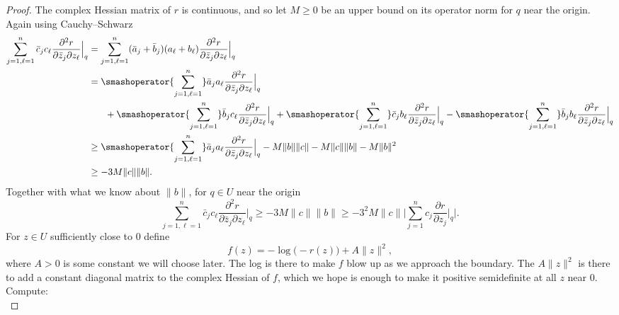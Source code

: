 \documentclass[12pt,openany]{book}
\newcommand{\snorm}[1]{\lVert {#1} \rVert}
\newcommand{\Babs}[1]{\Bigl\lvert {#1} \Bigr\rvert}
\newcommand{\BBabs}[1]{\Biggl\lvert {#1} \Biggr\rvert}
\theoremstyle{plain}
\theoremstyle{remark}
\theoremstyle{definition}
\theoremstyle{exercise}
\theoremstyle{example}
\begin{document}
\begin{proof}
\pagebreak[1]
The complex Hessian matrix of $r$ is continuous, and so let
$M \geq 0$ be an upper bound on its operator norm for $q$ near the origin.
Again using Cauchy--Schwarz
\begin{equation*}
\begin{split}
\sum_{j=1,\ell=1}^n
\bar{c}_j c_\ell \frac{\partial^2 r}{\partial \bar{z}_j \partial z_\ell} \Big|_q 
& =
\sum_{j=1,\ell=1}^n
( \bar{a}_j + \bar{b}_j )  (a_\ell + b_\ell) \frac{\partial^2 r}{\partial \bar{z}_j \partial z_\ell} \Big|_q 
\\
& =
\smashoperator{\sum_{j=1,\ell=1}^n}
\bar{a}_j a_\ell \frac{\partial^2 r}{\partial \bar{z}_j \partial z_\ell} \Big|_q 
\\
& \phantom{=} \quad
+
\smashoperator{\sum_{j=1,\ell=1}^n}
\bar{b}_j c_\ell \frac{\partial^2 r}{\partial \bar{z}_j \partial z_\ell} \Big|_q 
+
\smashoperator{\sum_{j=1,\ell=1}^n}
\bar{c}_j  b_\ell \frac{\partial^2 r}{\partial \bar{z}_j \partial z_\ell} \Big|_q 
-
\smashoperator{\sum_{j=1,\ell=1}^n}
\bar{b}_j  b_\ell \frac{\partial^2 r}{\partial \bar{z}_j \partial z_\ell} \Big|_q 
\\
& \geq
\smashoperator{\sum_{j=1,\ell=1}^n}
\bar{a}_j a_\ell \frac{\partial^2 r}{\partial \bar{z}_j \partial z_\ell} \Big|_q 
-
M\snorm{b}\snorm{c}
-
M\snorm{c}\snorm{b}
-
M\snorm{b}^2
\\
& \geq
-
3 M\snorm{c}\snorm{b} .
\end{split}
\end{equation*}
Together with what we know about
$\snorm{b}$, for $q \in U$ near the origin
\begin{equation*}
\sum_{j=1,\ell=1}^n
\bar{c}_j c_\ell \frac{\partial^2 r}{\partial \bar{z}_j \partial z_\ell} \Big|_q 
\geq -3M \snorm{c} \snorm{b} %
\geq
-3^2 M \snorm{c}\BBabs{\sum_{j=1}^n c_j \frac{\partial r}{\partial z_j}
\Big|_q} .
\end{equation*}
For $z \in U$ sufficiently close to $0$ define
\begin{equation*}
f(z) = -\log \bigl(-r(z)\bigr) + A \snorm{z}^2 ,
\end{equation*}
where $A > 0$ is some constant we will choose later.
The log is there to make $f$ blow up as we approach the boundary.
The $A \snorm{z}^2$ is there to add a constant diagonal matrix to the complex
Hessian of $f$, which we hope is enough to make it positive semidefinite at
all $z$ near $0$.
Compute:
\begin{equation*}

\end{equation*}
\end{proof}
\end{document}
